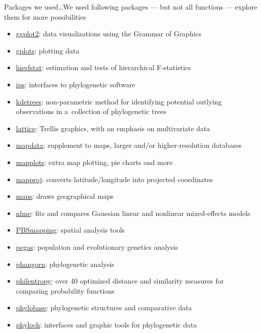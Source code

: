 \documentclass[compress, xelatex, 11pt, xcolor=svgnames, aspectratio=169, url={hyphens, lowtilde}]{beamer}
\begin{document}
\begin{frame}[allowframebreaks]{Packages we used\ldots}{We used following packages --- but not all functions --- explore them for more possibilities}
\begin{itemize}
		\item \href{https://CRAN.R-project.org/package=ggplot2}{ggplot2}: data visualizations using the Grammar of Graphics
		\item \href{https://CRAN.R-project.org/package=gplots}{gplots}: plotting data
		\item \href{https://CRAN.R-project.org/package=hierfstat}{hierfstat}: estimation and tests of hierarchical F-statistics
		\item \href{https://CRAN.R-project.org/package=ips}{ips}: interfaces to phylogenetic software
		\item \href{https://github.com/V-Z/kdetrees}{kdetrees}: non-parametric method for identifying potential outlying observations in a~collection of phylogenetic trees
		\item \href{https://CRAN.R-project.org/package=lattice}{lattice}: Trellis graphics, with an emphasis on multivariate data
		\item \href{https://CRAN.R-project.org/package=mapdata}{mapdata}: supplement to maps, larger and/or higher-resolution databases
		\item \href{https://CRAN.R-project.org/package=mapplots}{mapplots}: extra map plotting, pie charts and more
		\item \href{https://CRAN.R-project.org/package=mapproj}{mapproj}: converts latitude/longitude into projected coordinates
		\item \href{https://CRAN.R-project.org/package=maps}{maps}: draws geographical maps
		\item \href{https://CRAN.R-project.org/package=nlme}{nlme}: fits and compares Gaussian linear and nonlinear mixed-effects models
		\item \href{https://CRAN.R-project.org/package=PBSmapping}{PBSmapping}: spatial analysis tools
		\item \href{https://CRAN.R-project.org/package=pegas}{pegas}: population and evolutionary genetics analysis
		\item \href{https://CRAN.R-project.org/package=phangorn}{phangorn}: phylogenetic analysis
		\item \href{https://CRAN.R-project.org/package=philentropy}{philentropy}: over 40 optimized distance and similarity measures for comparing probability functions
		\item \href{https://CRAN.R-project.org/package=phylobase}{phylobase}: phylogenetic structures and comparative data
		\item \href{http://www.christophheibl.de/Rpackages.html}{phyloch}: interfaces and graphic tools for phylogenetic data

\end{itemize}
\end{frame}
\end{document}
